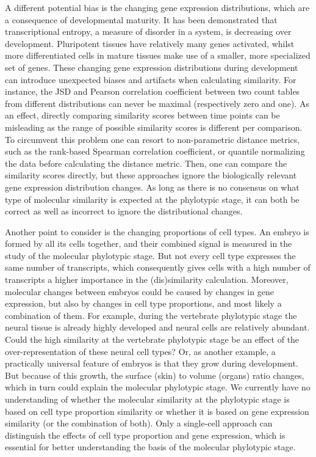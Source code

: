 A different potential bias is the changing gene expression distributions, which are a consequence of developmental maturity. It has been demonstrated that transcriptional entropy, a measure of disorder in a system, is decreasing over development\cite{Kannan2021}. Pluripotent tissues have relatively many genes activated, whilst more differentiated cells in mature tissues make use of a smaller, more specialized set of genes. These changing gene expression distributions during development can introduce unexpected biases and artifacts when calculating similarity. For instance, the JSD and Pearson correlation coefficient between two count tables from different distributions can never be maximal (respectively zero and one). As an effect, directly comparing similarity scores between time points can be misleading as the range of possible similarity scores is different per comparison. To circumvent this problem one can resort to non-parametric distance metrics, such as the rank-based Spearman correlation coefficient\cite{Irie2011}, or quantile normalizing the data before calculating the distance metric\cite{marletaz2018}. Then, one can compare the similarity scores directly, but these approaches ignore the biologically relevant gene expression distribution changes. As long as there is no consensus on what type of molecular similarity is expected at the phylotypic stage, it can both be correct as well as incorrect to ignore the distributional changes. 

Another point to consider is the changing proportions of cell types. An embryo is formed by all its cells together, and their combined signal is measured in the study of the molecular phylotypic stage. But not every cell type expresses the same number of transcripts\cite{Kim2023, Percharde2017}, which consequently gives cells with a high number of transcripts a higher importance in the (dis)similarity calculation. Moreover, molecular changes between embryos could be caused by changes in gene expression, but also by changes in cell type proportions, and most likely a combination of them. For example, during the vertebrate phylotypic stage the neural tissue is already highly developed and neural cells are relatively abundant. Could the high similarity at the vertebrate phylotypic stage be an effect of the over-representation of these neural cell types? Or, as another example, a practically universal feature of embryos is that they grow during development. But because of this growth, the surface (skin) to volume (organs) ratio changes, which in turn could explain the molecular phylotypic stage. We currently have no understanding of whether the molecular similarity at the phylotypic stage is based on cell type proportion similarity or whether it is based on gene expression similarity (or the combination of both). Only a single-cell approach can distinguish the effects of cell type proportion and gene expression, which is essential for better understanding the basis of the molecular phylotypic stage.

